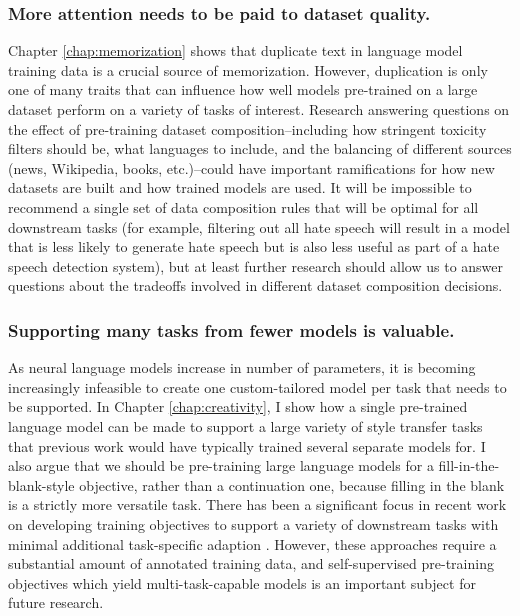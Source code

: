 \subsubsection{More attention needs to be paid to dataset quality.}
	Chapter \ref{chap:memorization} shows that duplicate text in language model training data is a crucial source of memorization.
	However, duplication is only one of many traits that can influence how well models pre-trained on a large dataset perform on a variety of tasks of interest.
	Research answering questions on the effect of pre-training dataset composition--including how stringent toxicity filters should be, what languages to include, and the balancing of different sources (news, Wikipedia, books, etc.)--could have important ramifications for how new datasets are built and how trained models are used.
	It will be impossible to recommend a single set of data composition rules that will be optimal for all downstream tasks (for example, filtering out all hate speech will result in a model that is less likely to generate hate speech but is also less useful as part of a hate speech detection system), but at least further research should allow us to answer questions about the tradeoffs involved in different dataset composition decisions. 
	
\subsubsection{Supporting many tasks from fewer models is valuable.}
	As neural language models increase in number of parameters, it is becoming increasingly infeasible to create one custom-tailored model per task that needs to be supported.
	In Chapter \ref{chap:creativity}, I show how a single pre-trained language model can be made to support a large variety of style transfer tasks that previous work would have typically trained several separate models for.
	I also argue that we should be pre-training large language models for a fill-in-the-blank-style objective, rather than a continuation one, because filling in the blank is a strictly more versatile task.
	There has been a significant focus in recent work on developing training objectives to support a variety of downstream tasks with minimal additional task-specific adaption \citep{wei2021finetuned,sanh2021multitask}.
	However, these approaches require a substantial amount of annotated training data, and self-supervised pre-training objectives which yield multi-task-capable models is an important subject for future research.

